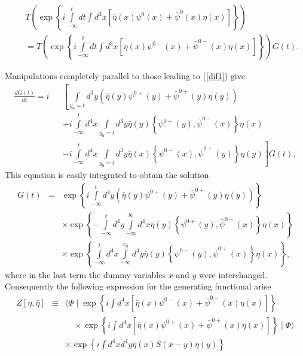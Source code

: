 \documentclass[12pt,letterpaper]{report}
\begin{document}
\begin{eqnarray}
&&T\left(\exp \left\{ i\int\limits_{-\infty }^tdt\int d^3x\left[
\bar{\eta} \left(x\right) \psi ^0\left(x\right)
+\bar{\psi}^0\left(x\right) \eta \left(x\right) \right] \right\}
\right) \nonumber \\ &&=T\left(\exp \left\{ i\int\limits_{-\infty
}^tdt\int d^3x\left[ \bar{\eta} \left(x\right) \psi ^{0-}\left(
x\right) +\bar{\psi}^{0-}\left(x\right) \eta \left(x\right)
\right] \right\} \right) G\left(t\right). \label{ferm1}
\end{eqnarray}

Manipulations completely parallel to those leading to (\ref{dif1})
give {\setlength\arraycolsep{0.5pt}
\begin{eqnarray}
\frac{dG\left(t\right) }{dt}=i &&\left[
\int\limits_{y_0=t}d^3y\left(\bar{ \eta}\left(y\right) \psi
^{0+}\left(y\right) +\bar{\psi}^{0+}\left(y\right) \eta \left(
y\right) \right) \right. \nonumber \\ &&+i\int\limits_{-\infty
}^td^4x\int\limits_{y_0=t}d^3y\bar{\eta}\left(y\right) \left\{
\psi ^{0+}\left(y\right),\bar{\psi}^{0-}\left(x\right) \right\}
\eta \left(x\right) \nonumber \\ &&\left. -i\int\limits_{-\infty
}^td^4x\int\limits_{y_0=t}d^3y\bar{\eta} \left(x\right) \left\{
\psi ^{0-}\left(x\right),\bar{\psi}^{0+}\left(y\right) \right\}
\eta \left(y\right) \right] G\left(t\right),
\end{eqnarray}}
This equation is easily integrated to obtain the solution
\begin{eqnarray}
G\left(t\right) &=&\exp \left\{ i\int\limits_{-\infty
}^td^4y\left(\bar{ \eta}\left(y\right) \psi ^{0+}\left(y\right)
+\bar{\psi}^{0+}\left(y\right) \eta \left(y\right) \right)
\right\} \nonumber \\ &&\times \exp \left\{ -\int\limits_{-\infty
}^td^4y\int\limits_{-\infty }^{y_0}d^4x\bar{\eta}\left(y\right)
\left\{ \psi ^{0+}\left(y\right),\bar{ \psi}^{0-}\left(x\right)
\right\} \eta \left(x\right) \right\} \nonumber
\\ &&\times \exp \left\{ \int\limits_{-\infty
}^td^4x\int\limits_{-\infty }^{x_0}d^4y\bar{\eta}\left(y\right)
\left\{ \psi ^{0-}\left(y\right),\bar{ \psi}^{0+}\left(x\right)
\right\} \eta \left(x\right) \right\},
\end{eqnarray}
where in the last term the dummy variables $x$ and $y$ were
interchanged. Consequently the following expression for the
generating functional arise \cite{Gasiorowicz}
{\setlength\arraycolsep{0.5pt}
\begin{eqnarray}
Z\left[ \eta,\bar{\eta}\right] &\equiv &\langle \Phi \mid \exp
\left\{ i\int d^4x\left[ \bar{\eta}\left(x\right) \psi ^{0-}\left(
x\right) +\bar{ \psi}^{0-}\left(x\right) \eta \left(x\right)
\right] \right\} \nonumber \\ &&\quad\times\exp \left\{ i\int
d^4x\left[ \bar{\eta}\left(x\right) \psi ^{0+}\left(x\right)
+\bar{\psi}^{0+}\left(x\right) \eta \left(x\right) \right]
\right\} \mid \Phi \rangle \nonumber \\ &&\times \exp \left\{
i\int d^4xd^4y\bar{\eta}\left(x\right) S\left(x-y\right) \eta
\left(y\right) \right\} \label{fermiones}
\end{eqnarray}}
\end{document}
